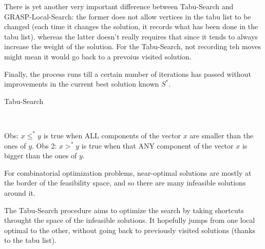 There is yet another very important difference between Tabu-Search and GRASP-Local-Search: the former does not allow vertices in the tabu list to be changed (each time it changes the solution, it records what has been done in the tabu list). whereas the latter doesn't really requires that since it tends to always increase the weight of the solution. For the Tabu-Search, not recording teh moves might mean it would go back to a prevoius visited solution.

Finally, the process runs till a certain number of iterations has passed without improvements in the current best solution known $S^*$.

\begin{algorithm}[H]
    \caption{Tabu-Search}
    \begin{algorithmic}[1]
            \EndIf
        \EndWhile
        \\
    \end{algorithmic}
    \label{algorithm:tabu-local-search}
\end{algorithm}

Obs: $x \leqslant^* y$ is true when ALL components of the vector $x$ are smaller than the ones of $y$. Obs 2: $x >^* y$ is true when that ANY component of the vector $x$ is bigger than the ones of $y$.

For combinatorial optimization problems, near-optimal solutions are mostly at the border of the feasibility space, and so there are many infeasible solutions around it.

The Tabu-Search procedure aims to optimize the search by taking shortcuts throught the space of the infeasible solutions. It hopefully jumps from one local optimal to the other, without going back to previously visited solutions (thanks to the tabu list).

